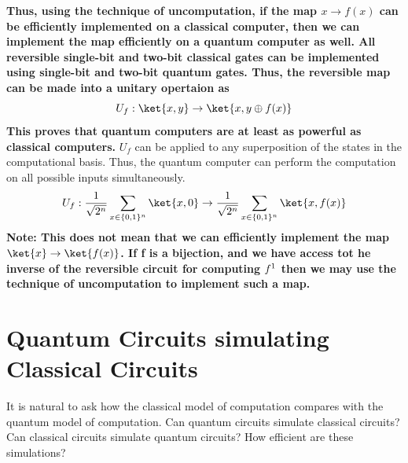 \documentclass[12pt, oneside]{book}
\theoremstyle{definition}
\theoremstyle{definition}
\theoremstyle{remark}
\begin{document}
\textbf{Thus, using the technique of uncomputation, if the map $x \rightarrow f(x)$ can be efficiently implemented on a classical computer, then we can implement the map
efficiently on a quantum computer as well. All reversible single-bit and two-bit classical gates can be implemented using single-bit and two-bit quantum gates. Thus, the reversible map can be made into a unitary opertaion as}
\[ U_f:\ket{x,y}\rightarrow\ket{x,y\oplus f(x)}\] 
\textbf{This proves that quantum computers are at least as powerful as classical computers.}
$U_f$ can be applied to any superposition of the states in the computational basis. Thus, the quantum computer can perform the computation on all possible inputs simultaneously.
\[ U_f:\frac{1}{\sqrt{2^n}}\sum_{x\in\{0,1\}^n}\ket{x,0}\rightarrow \frac{1}{\sqrt{2^n}}\sum_{x\in\{0,1\}^n}\ket{x,f(x)}\]
\textbf{Note: This does not mean that we can efficiently implement the map $\ket{x}\rightarrow \ket{f(x)}$. If f is a bijection, and we have
access tot he inverse of the reversible circuit for computing $f^{\-1}$ then we may use the technique of uncomputation to implement such a map.}


\section{Quantum Circuits simulating Classical Circuits}
It is natural to ask how the classical model of computation compares with the quantum model of computation. Can quantum circuits simulate classical circuits? Can classical circuits simulate quantum circuits? How efficient are these simulations?
\end{document}

